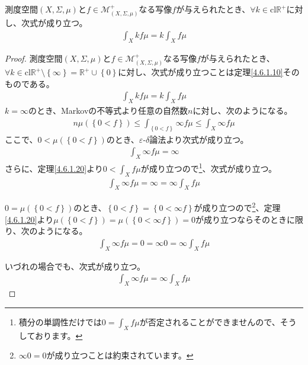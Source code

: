 \documentclass[dvipdfmx]{jsarticle}
\begin{document}
\begin{thm}\label{4.6.1.30}
測度空間$(X,\varSigma,\mu)$と$f \in \mathcal{M}_{(X,\varSigma,\mu)}^{+}$なる写像$f$が与えられたとき、$\forall k \in \mathrm{cl}\mathbb{R}^{+}$に対し、次式が成り立つ。
\begin{align*}
\int_{X} {kf\mu} = k\int_{X} {f\mu}
\end{align*}
\end{thm}
\begin{proof}
測度空間$(X,\varSigma,\mu)$と$f \in \mathcal{M}_{(X,\varSigma,\mu)}^{+}$なる写像$f$が与えられたとき、$\forall k \in \mathrm{cl}\mathbb{R}^{+} \setminus \left\{ \infty \right\} = \mathbb{R}^{+} \cup \left\{ 0 \right\}$に対し、次式が成り立つことは定理\ref{4.6.1.10}そのものである。
\begin{align*}
\int_{X} {kf\mu} = k\int_{X} {f\mu}
\end{align*}
$k = \infty$のとき、Markovの不等式より任意の自然数$n$に対し、次のようになる。
\begin{align*}
n\mu\left( \left\{ 0 < f \right\} \right) \leq \int_{\left\{ 0 < f \right\}} {\infty f\mu} \leq \int_{X} {\infty f\mu}
\end{align*}
ここで、$0 < \mu\left( \left\{ 0 < f \right\} \right)$のとき、$\varepsilon$-$\delta$論法より次式が成り立つ。
\begin{align*}
\int_{X} {\infty f\mu} = \infty
\end{align*}
さらに、定理\ref{4.6.1.20}より$0 < \int_{X} {f\mu}$が成り立つので\footnote{積分の単調性だけでは$0 = \int_{X} {f\mu}$が否定されることができませんので、そうしております。}、次式が成り立つ。
\begin{align*}
\int_{X} {\infty f\mu} = \infty = \infty\int_{X} {f\mu}
\end{align*}\par
$0 = \mu\left( \left\{ 0 < f \right\} \right)$のとき、$\left\{ 0 < f \right\} = \left\{ 0 < \infty f \right\}$が成り立つので\footnote{$\infty 0 = 0$が成り立つことは約束されています。}、定理\ref{4.6.1.20}より$\mu\left( \left\{ 0 < f \right\} \right) = \mu\left( \left\{ 0 < \infty f \right\} \right) = 0$が成り立つならそのときに限り、次のようになる。
\begin{align*}
\int_{X} {\infty f\mu} = 0 = \infty 0 = \infty\int_{X} {f\mu}
\end{align*}\par
いづれの場合でも、次式が成り立つ。
\begin{align*}
\int_{X} {\infty f\mu} = \infty\int_{X} {f\mu}
\end{align*}
\end{proof}
\end{document}
